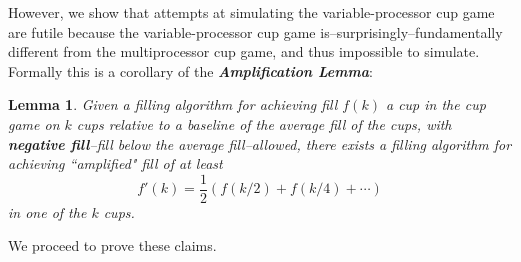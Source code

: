 \documentclass{article}[11pt]
\newcommand{\defn}[1]{{\textit{\textbf{\boldmath #1}}}}
\newtheorem{lemma}{Lemma}
\begin{document}
However, we show that attempts at simulating the variable-processor cup game
are futile because the variable-processor cup game
is--surprisingly--fundamentally different from the multiprocessor cup game, and
thus impossible to simulate. Formally this is a corollary of the
\defn{Amplification Lemma}:

\begin{lemma}
  \label{lem:amplification}
  Given a filling algorithm for achieving fill $f(k)$ a cup in the cup game on
  $k$ cups relative to a baseline of the average fill of the cups, with
  \defn{negative fill}--fill below the average fill--allowed, there exists a
  filling algorithm for achieving ``amplified" fill of at least $$f'(k) =
  \frac{1}{2}(f(k/2) + f(k/4) + \cdots )$$ in one of the $k$ cups.
\end{lemma}

We proceed to prove these claims. 
\end{document}
